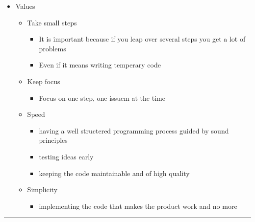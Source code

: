 \documentclass[11pt]{article}
\providecommand{\tightlist}{%
      \setlength{\itemsep}{0pt}\setlength{\parskip}{0pt}}
\begin{document}
\begin{itemize}
\tightlist
\item
  Values

  \begin{itemize}
  \tightlist
  \item
    Take small steps

    \begin{itemize}
    \tightlist
    \item
      It is important because if you leap over several steps you get a
      lot of problems
    \item
      Even if it means writing temperary code
    \end{itemize}
  \item
    Keep focus

    \begin{itemize}
    \tightlist
    \item
      Focus on one step, one issuem at the time
    \end{itemize}
  \item
    Speed

    \begin{itemize}
    \tightlist
    \item
      having a well structered programming process guided by sound
      principles
    \item
      testing ideas early
    \item
      keeping the code maintainable and of high quality
    \end{itemize}
  \item
    Simplicity

    \begin{itemize}
    \tightlist
    \item
      implementing the code that makes the product work and no more
    \end{itemize}
  \end{itemize}
\end{itemize}

\begin{center}\rule{0.5\linewidth}{\linethickness}\end{center}
\end{document}
